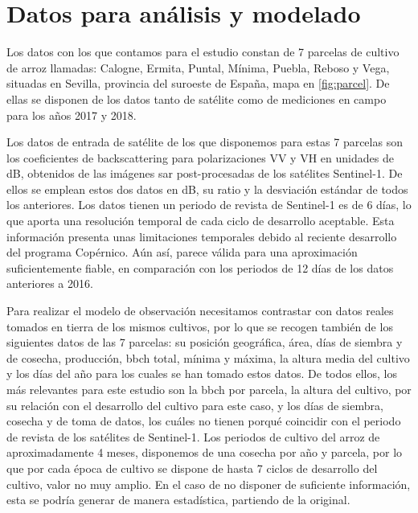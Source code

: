 \section{Datos para análisis y modelado}
\par Los datos con los que contamos para el estudio constan de 7 parcelas de cultivo de arroz llamadas: Calogne, Ermita, Puntal, Mínima, Puebla, Reboso y Vega, situadas en Sevilla, provincia del suroeste de España, mapa en \ref{fig:parcel}. De ellas se disponen de los datos tanto de satélite como de mediciones en campo para los años 2017 y 2018. 
\\
\par Los datos de entrada de satélite de los que disponemos para estas 7 parcelas son los coeficientes de backscattering para polarizaciones VV y VH en unidades de dB, obtenidos de las imágenes \gls{sar} post-procesadas de los satélites Sentinel-1. De ellos se emplean estos dos datos en dB, su ratio y la desviación estándar de todos los anteriores. Los datos tienen un periodo de revista de Sentinel-1 es de 6 días, lo que aporta una resolución temporal de cada ciclo de desarrollo aceptable. Esta información presenta unas limitaciones temporales debido al reciente desarrollo del programa Copérnico. Aún así, parece válida para una aproximación suficientemente fiable, en comparación con los periodos de 12 días de los datos anteriores a 2016.
\\
\par Para realizar el modelo de observación necesitamos contrastar con datos reales tomados en tierra de los mismos cultivos, por lo que se recogen también de los siguientes datos de las 7 parcelas: su posición geográfica, área, días de siembra y de cosecha, producción, \gls{bbch} total, mínima y máxima, la altura media del cultivo y los días del año para los cuales se han tomado estos datos. De todos ellos, los más relevantes para este estudio son la \gls{bbch} por parcela, la altura del cultivo, por su relación con el desarrollo del cultivo para este caso, y los días de siembra, cosecha y de toma de datos, los cuáles no tienen porqué coincidir con el periodo de revista de los satélites de Sentinel-1.  Los periodos de cultivo del arroz de aproximadamente 4 meses, disponemos de una cosecha por año y parcela, por lo que por cada época de cultivo se dispone de hasta 7 ciclos de desarrollo del cultivo, valor no muy amplio. En el caso de no disponer de suficiente información, esta se podría generar de manera estadística, partiendo de la original. 
